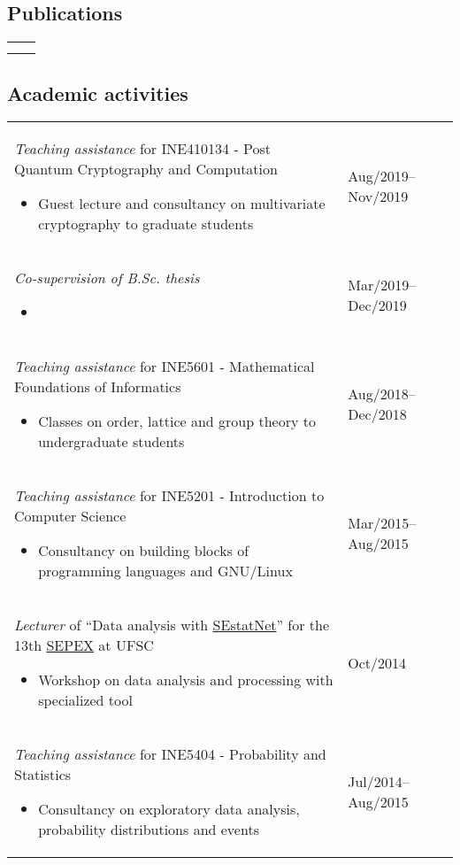 \documentclass[12pt]{article}
\makeatletter
\newenvironment{datetable}
  {\newcolumntype{R}{>{\raggedleft\arraybackslash}p{0.14\textwidth}}
   \newcolumntype{L}{p{0.84\textwidth}}
   \begin{tabular}{@{\hspace{0mm}}LR}}
  {\end{tabular}}
\newenvironment{contenttable}[1]
  {\subsection*{#1}
   \begin{datetable}}
  {\end{datetable}}
\makeatother
\begin{document}
\begin{contenttable}{Publications}
  \hspace{0mm}
    & \cite{Zambonin:inproc:2019:jul} \vspace{1.25cm} \\

  \hspace{0mm}
    & \cite{Perin:inproc:2018:jun} \\
\end{contenttable}

\begin{contenttable}{Academic activities}
  \textit{Teaching assistance} for INE410134 - Post Quantum Cryptography and
    Computation
  \begin{itemize}
    \item Guest lecture and consultancy on multivariate cryptography to
        graduate students
  \end{itemize} & Aug/2019--Nov/2019 \\

  \textit{Co-supervision of B.Sc. thesis}
  \begin{itemize}
    \item {}
  \end{itemize} & Mar/2019--Dec/2019 \\

  \textit{Teaching assistance} for INE5601 - Mathematical Foundations of
    Informatics
  \begin{itemize}
    \item Classes on order, lattice and group theory to undergraduate students
  \end{itemize} & Aug/2018--Dec/2018 \\

  \textit{Teaching assistance} for INE5201 - Introduction to Computer Science
  \begin{itemize}
    \item Consultancy on building blocks of programming languages and GNU/Linux
  \end{itemize} & Mar/2015--Aug/2015 \\

  \textit{Lecturer} of ``Data analysis with
    \href{http://sestatnet.ufsc.br}{SEstatNet}'' for the 13th
    \href{https://sepex.ufsc.br/}{SEPEX} at UFSC
  \begin{itemize}
    \item Workshop on data analysis and processing with specialized tool
  \end{itemize} & Oct/2014 \\

  \textit{Teaching assistance} for INE5404 - Probability and Statistics
  \begin{itemize}
    \item Consultancy on exploratory data analysis, probability distributions
        and events
  \end{itemize} & Jul/2014--Aug/2015 \\
\end{contenttable}
\end{document}
